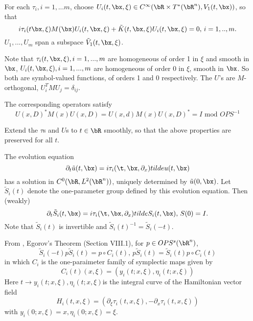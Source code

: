 



For each $\tau_i, i =1,...m$, choose $U_i(t,\bx,\xi) \in C^{\infty}(\bR \times T^*(\bR^n),V_1(t,\bx))$,  so that
\[
  i\tau_i(t\bx,\xi) M(\bx) U_i(t,\bx,\xi) + \tilde{K}(t,\bx,\xi) U_i(t,\bx,\xi)=0, \, i=1,..,m.
\]
$U_1,...,U_m$ span a subspace $\tilde{V}_1(t,\bx,\xi)$. 

Note that $\tau_i(t,\bx,\xi), i=1,...,m$ are homogeneous of order 1 in
$\xi$ and smooth in $\bx$, $U_i(t,\bx,\xi), i=1,...,m$ are homogeneous
of order 0 in $\xi$, smooth in $\bx$. So both are symbol-valued
functions, of orders 1 and 0 respectively. The $U$'s are
$M$-orthogonal, $U_i^TMU_j = \delta_{ij}$.

The corresponding operators satisfy
\begin{equation}
  \label{eqn:ortho}
  U(x,D)^*M(x) U(x,D) = U(x,d)M(x)U(x,D)^* = I \mbox{ mod } OPS^{-1}
\end{equation}

Extend the $\tau$s and $U$s to $t \in \bR$ smoothly, so that the above 
properties are preserved for all $t$. 

The evolution equation
\[
  \partial_t \tilde{u}(t,\bx) =
  i\tau_i(\t,\bx,\partial_x)\\tilde{u}(t,\bx)
\]
has a solution in $C^0(\bR,L^2(\bR^n))$, uniquely determined
by $\tilde{u}(0,\bx)$. Let $\tilde{S}_i(t)$ denote the one-parameter
group defined by this evolution equation. Then (weakly)
\[
  \partial_t \tilde{S}_i(t,\bx) =
  i\tau_i(\t,\bx,\partial_x)tilde{S}_i(t,\bx),\,S(0) = I.
\]
Note that $\tilde{S}_i(t)$ is invertible and $\tilde{S}_i(t)^{-1} =
\tilde{S}_i(-t)$.

From \cite{Tay:81}, Egorov's Theorem (Section VIII.1), for $p \in OPS^s(\bR^n)$,
\begin{equation}
  \label{eqn:egorov}
   \tilde{S}_i(-t) p \tilde{S}_i(t)=  p \circ C_i(t),\, p\tilde{S}_i(t) =
   \tilde{S}_i(t)p \circ C_i(t)
\end{equation}
in which $C_i$ is the one-paraimeter family of symplectic maps given by
\begin{equation}
  \label{eqn:canon}
  C_i(t)(x,\xi)=(y_i(t;x,\xi),\eta_i(t;x,\xi))
\end{equation}
Here $t \rightarrow y_i(t;x,\xi),\eta_i(t;x,\xi) $is the integral curve of the
Hamiltonian vector field
\[
  H_i(t,x,\xi) = (\partial_{\xi}\tau_i(t,x,\xi), - \partial_x\tau_i(t,x,\xi))
\]
with $y_i(0;x,\xi)=x, \eta_i(0;x,\xi)=\xi$.

